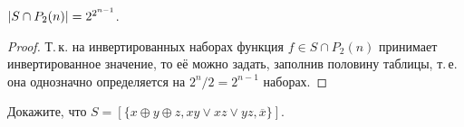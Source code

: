 \begin{proposal}
    $\left\lvert S \cap P_2(n)\right\rvert = 2^{2^{n - 1}}$.
\end{proposal}

\begin{proof}
    Т.\,к. на инвертированных наборах функция $f \in S \cap P_2(n)$ принимает инвертированное значение, то её можно задать, заполнив половину таблицы, т.\,е. она однозначно определяется на $2^n / 2 = 2^{n - 1}$ наборах.
\end{proof}

\begin{exercise}
    Докажите, что $S = [\{x \oplus y \oplus z, xy \vee xz \vee yz, \overline{x}\}]$.
\end{exercise}